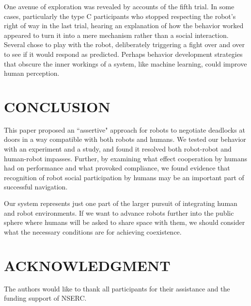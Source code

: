 \documentclass[letterpaper, 10 pt, conference]{ieeeconf}  %
\begin{document}
One avenue of exploration was revealed by accounts of the fifth trial. In some cases, particularly the type C participants who stopped respecting the robot's right of way in the last trial, hearing an explanation of how the behavior worked appeared to turn it into a mere mechanism rather than a social interaction. Several chose to play with the robot, deliberately triggering a fight over and over to see if it would respond as predicted. Perhaps behavior development strategies that obscure the inner workings of a system, like machine learning, could improve human perception.

\section{CONCLUSION}

This paper proposed an ``assertive" approach for robots to negotiate deadlocks at doors in a way compatible with both robots and humans. We tested our behavior with an experiment and a study, and found it resolved both robot-robot and human-robot impasses. Further, by examining what effect cooperation by humans had on performance and what provoked compliance, we found evidence that recognition of robot social participation by humans may be an important part of successful navigation.

Our system represents just one part of the larger pursuit of integrating human and robot environments. If we want to advance robots further into the public sphere where humans will be asked to share space with them, we should consider what the necessary conditions are for achieving coexistence.

\section*{ACKNOWLEDGMENT}

The authors would like to thank all participants for their assistance and the funding support of NSERC.
\end{document}
